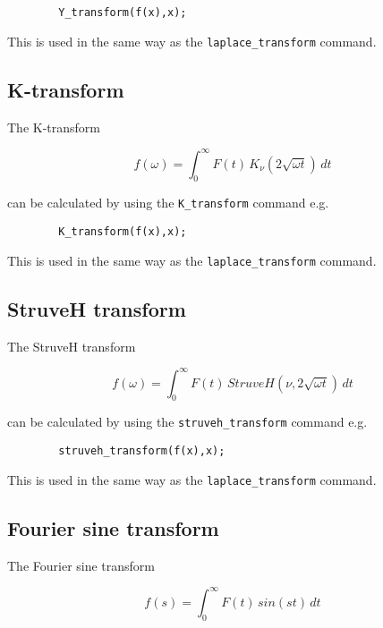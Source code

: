 \begin{verbatim}
        Y_transform(f(x),x);
\end{verbatim}

This is used in the same way as the \verb+laplace_transform+ command.

\subsection{K-transform}

The K-transform

\begin{displaymath}
f(\omega) = \int_{0}^{\infty} F(t) \,K_{\nu}(2\sqrt{\omega t}) \,dt
\end{displaymath}

can be calculated by using the \verb+K_transform+ command e.g.

\begin{verbatim}
        K_transform(f(x),x);
\end{verbatim}

This is used in the same way as the \verb+laplace_transform+ command.

\subsection{StruveH transform}

The StruveH transform

\begin{displaymath}
f(\omega) = \int_{0}^{\infty} F(t) \,StruveH(\nu,2\sqrt{\omega t}) \,dt
\end{displaymath}

can be calculated by using the \verb+struveh_transform+ command e.g.

\begin{verbatim}
        struveh_transform(f(x),x);
\end{verbatim}

This is used in the same way as the \verb+laplace_transform+ command.

\subsection{Fourier sine transform}

The Fourier sine transform

\begin{displaymath}
f(s) = \int_{0}^{\infty} F(t) \,sin (st) \,dt
\end{displaymath}

